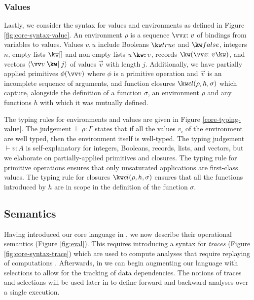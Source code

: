 \subsubsection{Values}
Lastly, we consider the syntax for values and environments as defined in Figure \ref{fig:core-syntax-value}. An environment $\rho$ is a sequence $\vec{\bind{x}{v}}$ of bindings from variables to values. Values $v, u$ include Booleans $\exTrue$ and $\exFalse$, integers $n$, empty lists $\exNil$ and non-empty lists $\exCons{u}{v}$, records $\exRec{\vec{\bind{x}{v}}}$, and vectors $\exVecVal{\vec{v}}{j}$ of values $\vec{v}$ with length $j$. Additionally, we have partially applied primitives $\exPrimOp{\phi}{\vec{v}}$ where $\phi$ is a primitive operation and $\vec{v}$ is an incomplete sequence of arguments, and function closures $\exClosure{\rho}{h}{\sigma}$ which capture, alongside the definition of a function $\sigma$, an environment $\rho$ and any functions $h$ with which it was mutually defined.


\noindent
The typing rules for environments and values are given in Figure \ref{core-typing-value}. The judgement $\vdash \rho: \Gamma$ states that if all the values $v_i$ of the environment are well typed, then the environment itself is well-typed. The typing judgement $\vdash v: A$ is self-explanatory for integers, Booleans, records, lists, and vectors, but we elaborate on partially-applied primitives and closures. The typing rule for primitive operations ensures that only unsaturated applications are first-class values. The typing rule for closures $\exClosure{\rho}{h}{\sigma}$ ensures that all the functions introduced by $h$ are in scope in the definition of the function $\sigma$.


\subsection{Semantics}

Having introduced our core language in , we now describe their operational semantics (Figure \ref{fig:eval}). This requires introducing a syntax for \textit{traces} (Figure \ref{fig:core-syntax-trace}) which are used to compute analyses that require replaying of computations \cite{perera12a}. Afterwards, in  we can begin augmenting our language with selections to allow for the tracking of data dependencies. The notions of traces and selections will be used later in  to define forward and backward analyses over a single execution.

